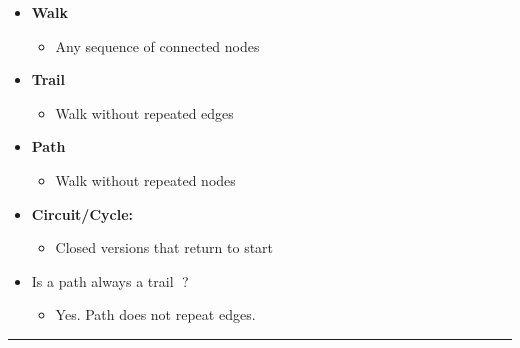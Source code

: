 \documentclass[
  letterpaper,
  DIV=11,
  numbers=noendperiod,
  oneside]{scrartcl}
\providecommand{\tightlist}{%
  \setlength{\itemsep}{0pt}\setlength{\parskip}{0pt}}
\begin{document}
\begin{itemize}
\tightlist
\item
  \textbf{Walk}

  \begin{itemize}
  \tightlist
  \item
    Any sequence of connected nodes
  \end{itemize}
\item
  \textbf{Trail}

  \begin{itemize}
  \tightlist
  \item
    Walk without repeated edges
  \end{itemize}
\item
  \textbf{Path}

  \begin{itemize}
  \tightlist
  \item
    Walk without repeated nodes
  \end{itemize}
\item
  \textbf{Circuit/Cycle:}

  \begin{itemize}
  \tightlist
  \item
    Closed versions that return to start
  \end{itemize}
\item
  {Is a path always a trail 🤔?}

  \begin{itemize}
  \tightlist
  \item
    {Yes. Path does not repeat edges.}
  \end{itemize}
\end{itemize}

\begin{center}\rule{0.5\linewidth}{0.5pt}\end{center}
\end{document}
